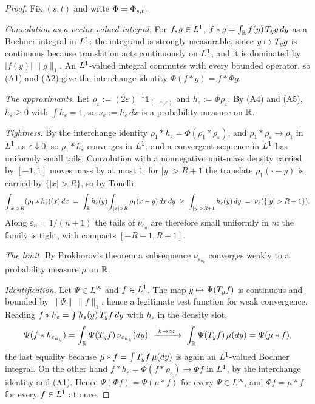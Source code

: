 \begin{proof}
\leanok
Fix $(s,t)$ and write $\Phi = \Phi_{s,t}$.

\emph{Convolution as a vector-valued integral.} For $f, g \in L^1$,
$f * g = \int_{\mathbb{R}} f(y)\,T_{y}g\,dy$ as a Bochner integral in $L^1$: the integrand is
strongly measurable, since $y \mapsto T_{y}g$ is continuous because translation acts
continuously on $L^1$, and it is dominated by $|f(y)|\,\|g\|_1$. An $L^1$-valued integral commutes with every bounded operator, so (A1) and
(A2) give the interchange identity $\Phi(f * g) = f * \Phi g$.

\emph{The approximants.} Let $\rho_\varepsilon := (2\varepsilon)^{-1}\mathbf 1_{(-\varepsilon,\varepsilon)}$
and $h_\varepsilon := \Phi\rho_\varepsilon$. By (A4) and (A5), $h_\varepsilon \ge 0$ with
$\int h_\varepsilon = 1$, so $\nu_\varepsilon := h_\varepsilon\,dx$ is a probability measure on
$\mathbb{R}$.

\emph{Tightness.} By the interchange identity $\rho_1 * h_\varepsilon = \Phi(\rho_1 *
\rho_\varepsilon)$, and $\rho_1 * \rho_\varepsilon \to \rho_1$ in $L^1$ as
$\varepsilon \downarrow 0$, so $\rho_1 * h_\varepsilon$ converges in $L^1$; and a convergent
sequence in $L^1$ has uniformly small tails. Convolution with a nonnegative unit-mass density
carried by $[-1,1]$ moves mass by at most $1$: for $|y| > R+1$ the translate
$\rho_1(\cdot - y)$ is carried by $\{|x| > R\}$, so by Tonelli
\[
  \int_{|x| > R} (\rho_1 * h_\varepsilon)(x)\,dx
  \;=\; \int_\RR h_\varepsilon(y)\int_{|x|>R}\rho_1(x-y)\,dx\,dy
  \;\ge\; \int_{|y| > R+1} h_\varepsilon(y)\,dy
  \;=\; \nu_\varepsilon(\{|y| > R+1\}).
\]
Along $\varepsilon_n = 1/(n+1)$ the tails of $\nu_{\varepsilon_n}$ are therefore small
uniformly in $n$: the family is tight, with compacts $[-R-1, R+1]$.

\emph{The limit.} By Prokhorov's theorem a subsequence $\nu_{\varepsilon_{n_k}}$ converges
weakly to a probability measure $\mu$ on $\mathbb{R}$.

\emph{Identification.} Let $\Psi \in L^\infty$ and $f \in L^1$. The map
$y \mapsto \Psi(T_{y}f)$ is continuous and bounded by $\|\Psi\|\,\|f\|_1$, hence a legitimate
test function for weak convergence. Reading $f * h_\varepsilon = \int h_\varepsilon(y)\,T_{y}f\,dy$
with $h_\varepsilon$ in the density slot,
\[
  \Psi(f * h_{\varepsilon_{n_k}}) = \int_{\mathbb{R}} \Psi(T_{y}f)\,\nu_{\varepsilon_{n_k}}(dy)
  \ \xrightarrow{\ k \to \infty\ }\ \int_{\mathbb{R}} \Psi(T_{y}f)\,\mu(dy) = \Psi(\mu * f),
\]
the last equality because $\mu * f = \int T_{y}f\,\mu(dy)$ is again an $L^1$-valued Bochner
integral. On the other hand $f * h_\varepsilon = \Phi(f * \rho_\varepsilon) \to \Phi f$ in
$L^1$, by the interchange identity and (A1). Hence $\Psi(\Phi f) = \Psi(\mu * f)$ for every
$\Psi \in L^\infty$, and $\Phi f = \mu * f$ for every $f \in L^1$ at once.


\end{proof}
